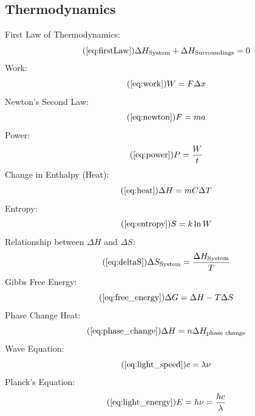     \subsection{Thermodynamics}
        First Law of Thermodynamics:
        \begin{equation}\tag{\ref{eq:firstLaw}}
            \Delta H_\text{System} + \Delta H_\text{Surroundings} = 0
        \end{equation}
        Work:
        \begin{equation}\tag{\ref{eq:work}}
            W = F \Delta x
        \end{equation}
        Newton's Second Law:
        \begin{equation}\tag{\ref{eq:newton}}
                F = ma
        \end{equation}
        Power:
        \begin{equation}\tag{\ref{eq:power}}
            P = \frac{W}{t}
        \end{equation}
        Change in Enthalpy (Heat):
        \begin{equation}\tag{\ref{eq:heat}}
            \Delta H = mC\Delta T
        \end{equation}
        Entropy:
        \begin{equation}\tag{\ref{eq:entropy}}
            S = k \ln{W}
        \end{equation}
        Relationship between $\Delta H$ and $\Delta S$:
        \begin{equation}\tag{\ref{eq:deltaS}}
            \Delta S_\text{System} = \frac{\Delta H_\text{System}}{T}
        \end{equation}
        Gibbs Free Energy:
        \begin{equation}\tag{\ref{eq:free_energy}}
            \Delta G = \Delta H - T\Delta S
        \end{equation}
        Phase Change Heat:
        \begin{equation}\tag{\ref{eq:phase_change}}
            \Delta H = n\Delta H_\text{phase change}
        \end{equation}
        Wave Equation:
        \begin{equation}\tag{\ref{eq:light_speed}}
            c = \lambda \nu
        \end{equation}
        Planck's Equation:
        \begin{equation}\tag{\ref{eq:light_energy}}
            E = h\nu = \frac{hc}{\lambda}
        \end{equation}
